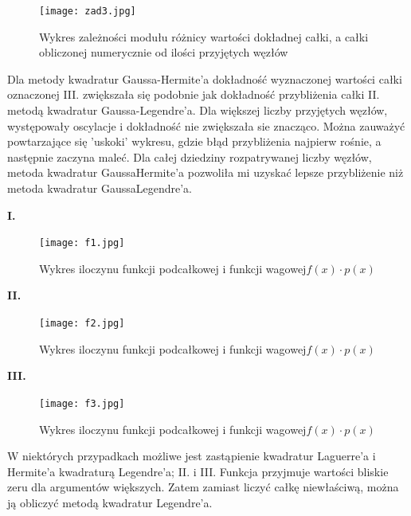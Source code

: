 \documentclass{article}
\begin{document}
\begin{figure}[H]
\begin{center}
\texttt{[image: zad3.jpg]}
\caption{Wykres zależności modułu różnicy wartości dokładnej całki, a całki obliczonej numerycznie od ilości przyjętych
węzłów}
\label{pierwszy} 
\end{center}
\end{figure}

Dla metody kwadratur Gaussa-Hermite’a dokładność wyznaczonej wartości całki
oznaczonej III. zwiększała się podobnie jak dokładność przybliżenia całki II. metodą
kwadratur Gaussa-Legendre’a. Dla większej liczby przyjętych węzłów,
występowały oscylacje i dokładność nie zwiększała sie znacząco. Można zauważyć powtarzające się
'uskoki' wykresu, gdzie błąd przybliżenia najpierw rośnie, a następnie zaczyna maleć.
Dla całej dziedziny rozpatrywanej liczby węzłów, metoda kwadratur GaussaHermite’a pozwoliła mi uzyskać lepsze przybliżenie niż metoda kwadratur GaussaLegendre’a.

\textbf{I.}

\begin{figure}[H]
\begin{center}
\texttt{[image: f1.jpg]}
\caption{Wykres iloczynu funkcji podcałkowej i funkcji wagowej$f(x)\cdot p(x)$}
\label{pierwszy} 
\end{center}
\end{figure}

\textbf{II.}

\begin{figure}[H]
\begin{center}
\texttt{[image: f2.jpg]}
\caption{Wykres iloczynu funkcji podcałkowej i funkcji wagowej$f(x)\cdot p(x)$}
\label{pierwszy} 
\end{center}
\end{figure}
\newpage
\textbf{III.}

\begin{figure}[H]
\begin{center}
\texttt{[image: f3.jpg]}
\caption{Wykres iloczynu funkcji podcałkowej i funkcji wagowej$f(x)\cdot p(x)$}
\label{pierwszy} 
\end{center}
\end{figure}

W niektórych przypadkach
możliwe jest zastąpienie kwadratur Laguerre’a i Hermite’a kwadraturą Legendre’a; II. i III. Funkcja przyjmuje wartości bliskie zeru dla argumentów większych. Zatem zamiast liczyć całkę niewłaściwą, można ją obliczyć metodą kwadratur Legendre’a.
\end{document}

